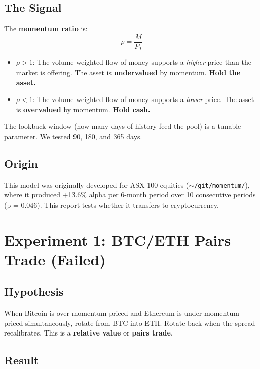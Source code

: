 \documentclass[11pt,a4paper]{article}
\begin{document}
\subsection{The Signal}

The \textbf{momentum ratio} is:
$$\rho = \frac{M}{P_T}$$

\begin{itemize}[leftmargin=2em]
    \item $\rho > 1$: The volume-weighted flow of money supports a
          \emph{higher} price than the market is offering. The asset is
          \textbf{undervalued} by momentum. \textbf{Hold the asset.}
    \item $\rho < 1$: The volume-weighted flow of money supports a
          \emph{lower} price. The asset is \textbf{overvalued} by
          momentum. \textbf{Hold cash.}
\end{itemize}

The lookback window (how many days of history feed the pool) is a
tunable parameter. We tested 90, 180, and 365 days.

\subsection{Origin}

This model was originally developed for ASX 100 equities
(\texttt{$\sim$/git/momentum/}), where it produced +13.6\% alpha per
6-month period over 10 consecutive periods (p = 0.046). This report
tests whether it transfers to cryptocurrency.


\section{Experiment 1: BTC/ETH Pairs Trade (Failed)}

\subsection{Hypothesis}

When Bitcoin is over-momentum-priced and Ethereum is
under-momentum-priced simultaneously, rotate from BTC into ETH.
Rotate back when the spread recalibrates. This is a
\textbf{relative value} or \textbf{pairs trade}.

\subsection{Result}
\end{document}
